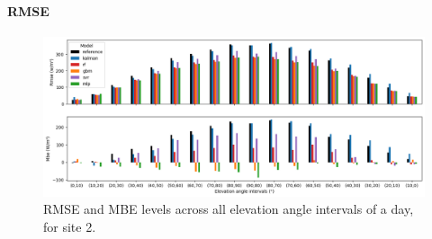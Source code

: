 \paragraph{RMSE}\indent
\begin{figure}[htb!]
    \centering
    \includegraphics[width=\columnwidth]{figures/first_study/rmse_mbe_site2.png}
\caption{RMSE and MBE levels across all elevation angle intervals of a day, for site 2.}
\end{figure}

